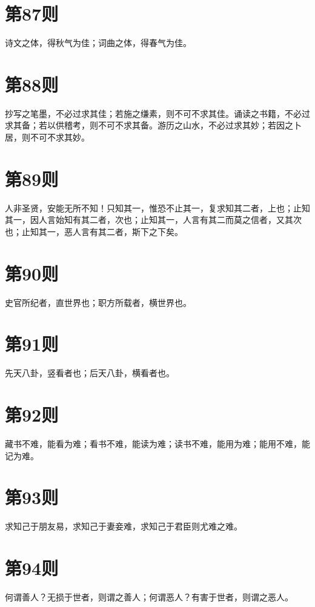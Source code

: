 \documentclass[12pt,a4paper]{ctexbook}
\begin{document}
\section{第87则}
诗文之体，得秋气为佳；词曲之体，得春气为佳。\par

\section{第88则}
抄写之笔墨，不必过求其佳；若施之缣素，则不可不求其佳。诵读之书籍，不必过求其备；若以供稽考，则不可不求其备。游历之山水，不必过求其妙；若因之卜居，则不可不求其妙。\par

\section{第89则}
人非圣贤，安能无所不知！只知其一，惟恐不止其一，复求知其二者，上也；止知其一，因人言始知有其二者，次也；止知其一，人言有其二而莫之信者，又其次也；止知其一，恶人言有其二者，斯下之下矣。\par

\section{第90则}
史官所纪者，直世界也；职方所载者，横世界也。\par

\section{第91则}
先天八卦，竖看者也；后天八卦，横看者也。\par

\section{第92则}
藏书不难，能看为难；看书不难，能读为难；读书不难，能用为难；能用不难，能记为难。\par

\section{第93则}
求知己于朋友易，求知己于妻妾难，求知己于君臣则尤难之难。\par

\section{第94则}
何谓善人？无损于世者，则谓之善人；何谓恶人？有害于世者，则谓之恶人。\par
\end{document}
